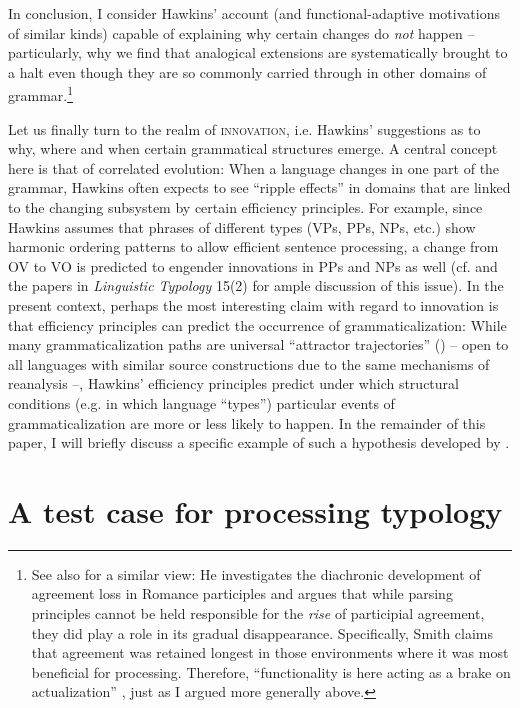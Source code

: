 \documentclass[output=paper]{langsci/langscibook}
\begin{document}
In conclusion, I consider Hawkins’ account (and functional-adaptive motivations of similar kinds) capable of explaining why certain changes do \textit{not} happen – particularly, why we find that analogical extensions are systematically brought to a halt even though they are so commonly carried through in other domains of grammar.\footnote{See also \citet{Smith2001} for a similar view: He investigates the diachronic development of agreement loss in Romance participles and argues that while parsing principles cannot be held responsible for the \textit{rise} of participial agreement, they did play a role in its gradual disappearance. Specifically, Smith claims that agreement was retained longest in those environments where it was most beneficial for processing. Therefore, “functionality is here acting as a brake on actualization” \citep[214]{Smith2001}, just as I argued more generally above.}

Let us finally turn to the realm of \textsc{innovation}, i.e. Hawkins’ suggestions as to why, where and when certain grammatical structures emerge. A central concept here is that of correlated evolution: When a language changes in one part of the grammar, Hawkins often expects to see “ripple effects” \citep[88]{Hawkins2014} in domains that are linked to the changing subsystem by certain efficiency principles. For example, since Hawkins assumes that phrases of different types (VPs, PPs, NPs, etc.) show harmonic ordering patterns to allow efficient sentence processing, a change from OV to VO is predicted to engender innovations in PPs and NPs as well (cf. \citealt{DunnEtAl2011} and the papers in \textit{Linguistic Typology} 15(2) for ample discussion of this issue). In the present context, perhaps the most interesting claim with regard to innovation is that efficiency principles can predict the occurrence of grammaticalization: While many grammaticalization paths are universal “attractor trajectories” (\citealt{BybeeBeckner2015}) – open to all languages with similar source constructions due to the same mechanisms of reanalysis –, Hawkins’ efficiency principles predict under which structural conditions (e.g. in which language “types”) particular events of grammaticalization are more or less likely to happen. In the remainder of this paper, I will briefly discuss a specific example of such a hypothesis developed by \citet{Hawkins2014}.

\section{ A test case for processing typology} 
\end{document}
